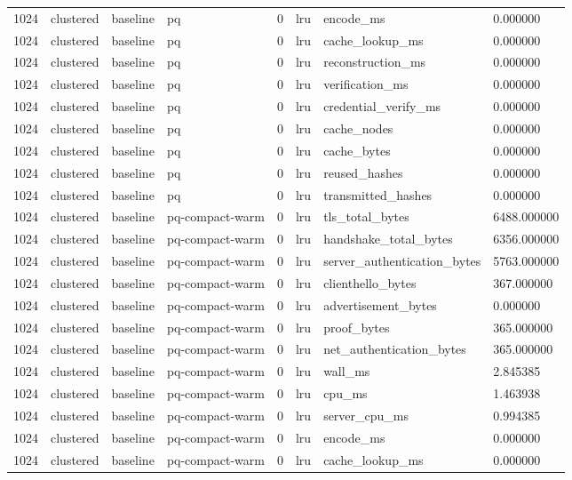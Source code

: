 \begin{tabular}{llllllll}
1024 & clustered & baseline & pq & 0 & lru & encode\_ms & 0.000000 \\
1024 & clustered & baseline & pq & 0 & lru & cache\_lookup\_ms & 0.000000 \\
1024 & clustered & baseline & pq & 0 & lru & reconstruction\_ms & 0.000000 \\
1024 & clustered & baseline & pq & 0 & lru & verification\_ms & 0.000000 \\
1024 & clustered & baseline & pq & 0 & lru & credential\_verify\_ms & 0.000000 \\
1024 & clustered & baseline & pq & 0 & lru & cache\_nodes & 0.000000 \\
1024 & clustered & baseline & pq & 0 & lru & cache\_bytes & 0.000000 \\
1024 & clustered & baseline & pq & 0 & lru & reused\_hashes & 0.000000 \\
1024 & clustered & baseline & pq & 0 & lru & transmitted\_hashes & 0.000000 \\
1024 & clustered & baseline & pq-compact-warm & 0 & lru & tls\_total\_bytes & 6488.000000 \\
1024 & clustered & baseline & pq-compact-warm & 0 & lru & handshake\_total\_bytes & 6356.000000 \\
1024 & clustered & baseline & pq-compact-warm & 0 & lru & server\_authentication\_bytes & 5763.000000 \\
1024 & clustered & baseline & pq-compact-warm & 0 & lru & clienthello\_bytes & 367.000000 \\
1024 & clustered & baseline & pq-compact-warm & 0 & lru & advertisement\_bytes & 0.000000 \\
1024 & clustered & baseline & pq-compact-warm & 0 & lru & proof\_bytes & 365.000000 \\
1024 & clustered & baseline & pq-compact-warm & 0 & lru & net\_authentication\_bytes & 365.000000 \\
1024 & clustered & baseline & pq-compact-warm & 0 & lru & wall\_ms & 2.845385 \\
1024 & clustered & baseline & pq-compact-warm & 0 & lru & cpu\_ms & 1.463938 \\
1024 & clustered & baseline & pq-compact-warm & 0 & lru & server\_cpu\_ms & 0.994385 \\
1024 & clustered & baseline & pq-compact-warm & 0 & lru & encode\_ms & 0.000000 \\
1024 & clustered & baseline & pq-compact-warm & 0 & lru & cache\_lookup\_ms & 0.000000 \\

\end{tabular}
